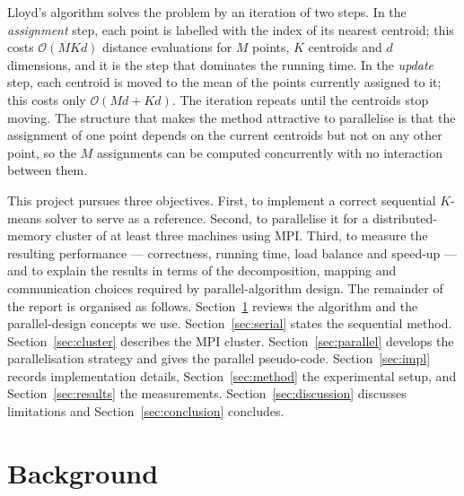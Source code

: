 \documentclass[11pt,a4paper]{article}
\begin{document}
Lloyd's algorithm solves the problem by an iteration of two steps. In the
\emph{assignment} step, each point is labelled with the index of its nearest
centroid; this costs $\mathcal{O}(M K d)$ distance evaluations for $M$ points,
$K$ centroids and $d$ dimensions, and it is the step that dominates the running
time. In the \emph{update} step, each centroid is moved to the mean of the
points currently assigned to it; this costs only $\mathcal{O}(M d + K d)$. The
iteration repeats until the centroids stop moving. The structure that makes the
method attractive to parallelise is that the assignment of one point depends on
the current centroids but not on any other point, so the $M$ assignments can be
computed concurrently with no interaction between them.

This project pursues three objectives. First, to implement a correct sequential
$K$-means solver to serve as a reference. Second, to parallelise it for a
distributed-memory cluster of at least three machines using MPI. Third, to
measure the resulting performance --- correctness, running time, load balance
and speed-up --- and to explain the results in terms of the decomposition,
mapping and communication choices required by parallel-algorithm design. The
remainder of the report is organised as follows.
Section~\ref{sec:background} reviews the algorithm and the parallel-design
concepts we use. Section~\ref{sec:serial} states the sequential method.
Section~\ref{sec:cluster} describes the MPI cluster.
Section~\ref{sec:parallel} develops the parallelisation strategy and gives the
parallel pseudo-code. Section~\ref{sec:impl} records implementation details,
Section~\ref{sec:method} the experimental setup, and
Section~\ref{sec:results} the measurements. Section~\ref{sec:discussion}
discusses limitations and Section~\ref{sec:conclusion} concludes.

\section{Background}
\label{sec:background}
\end{document}
